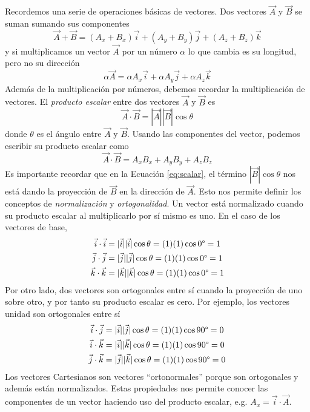 \documentclass{tufte-handout}
\begin{document}
Recordemos una serie de operaciones básicas de vectores.
Dos vectores $\vec{A}$ y $\vec{B}$ se suman sumando sus 
componentes
\begin{equation}
     \vec{A}+\vec{B}=(A_x+B_x)\vec{i} + (A_y+B_y)\vec{j} + (A_z+B_z)\vec{k}
\end{equation}
y si multiplicamos un vector $\vec{A}$ por un número $\alpha$
lo que cambia es su longitud, pero no su dirección
\begin{equation}
    \alpha\vec{A}=\alpha A_x\vec{i} + \alpha A_y\vec{j} + \alpha A_z\vec{k}
\end{equation}
Además de la multiplicación por números, debemos recordar la
multiplicación de vectores. El \textit{producto escalar}
entre dos vectores $\vec{A}$ y $\vec{B}$ es 
\begin{equation}
    \vec{A}\cdot \vec{B} =   |\vec{A}||\vec{B}|\cos\theta
    \label{eq:scalar}
\end{equation}
donde $\theta$ es el ángulo entre  $\vec{A}$ y $\vec{B}$.
Usando las componentes del vector, podemos escribir su
producto escalar como 
\begin{equation}
    \vec{A}\cdot \vec{B} =   A_xB_x + A_yB_y + A_zB_z
    \label{eq:dot_sum}
\end{equation}
Es importante recordar que en la Ecuación \ref{eq:scalar},
el término $|\vec{B}|\cos\theta$ nos está dando la proyección
de $\vec{B}$ en la dirección de $\vec{A}$. Esto nos permite
definir los conceptos de \textit{normalización} y 
\textit{ortogonalidad}. Un vector está normalizado cuando
su producto escalar al multiplicarlo por sí mismo es uno.
En el caso de los vectores de base,
\begin{align}
    \vec{i}\cdot\vec{i}&=|\vec{i}||\vec{i}|\cos\theta=(1)(1) \cos 0\degree= 1\\
    \vec{j}\cdot\vec{j}&=|\vec{j}||\vec{j}|\cos\theta=(1)(1) \cos 0\degree = 1 \\
    \vec{k}\cdot\vec{k}&=|\vec{k}||\vec{k}|\cos\theta=(1)(1) \cos 0\degree = 1
\end{align}
Por otro lado, dos vectores
son ortogonales entre sí cuando la proyección de uno sobre otro,
y por tanto su producto escalar es cero. Por ejemplo, los vectores
unidad son ortogonales entre sí
\begin{align}
    \vec{i}\cdot\vec{j}&=|\vec{i}||\vec{j}|\cos\theta=(1)(1) \cos 90\degree= 0\\
    \vec{i}\cdot\vec{k}&=|\vec{i}||\vec{k}|\cos\theta=(1)(1) \cos 90\degree = 0 \\
    \vec{j}\cdot\vec{k}&=|\vec{j}||\vec{k}|\cos\theta=(1)(1) \cos 90\degree = 0
\end{align}
Los vectores Cartesianos son vectores ``ortonormales'' porque son
ortogonales y además están normalizados. 
Estas propiedades nos permite conocer las componentes de un vector
haciendo uso del producto escalar, e.g. $A_x=\vec{i}\cdot\vec{A}$.
\end{document}

